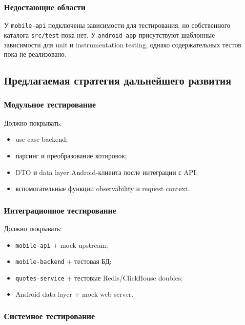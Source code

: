 \documentclass[12pt,a4paper]{article}
\begin{document}
\subsubsection{Недостающие области}

У \texttt{mobile-api} подключены зависимости для тестирования, но собственного каталога \texttt{src/test} пока нет. У \texttt{android-app} присутствуют шаблонные зависимости для unit и instrumentation testing, однако содержательных тестов пока не реализовано.

\subsection{Предлагаемая стратегия дальнейшего развития}

\subsubsection{Модульное тестирование}

Должно покрывать:

\begin{itemize}[leftmargin=1.2cm]
    \item use case backend;
    \item парсинг и преобразование котировок;
    \item DTO и data layer Android-клиента после интеграции с API;
    \item вспомогательные функции observability и request context.
\end{itemize}

\subsubsection{Интеграционное тестирование}

Должно покрывать:

\begin{itemize}[leftmargin=1.2cm]
    \item \texttt{mobile-api} + mock upstream;
    \item \texttt{mobile-backend} + тестовая БД;
    \item \texttt{quotes-service} + тестовые Redis/ClickHouse doubles;
    \item Android data layer + mock web server.
\end{itemize}

\subsubsection{Системное тестирование}
\end{document}
